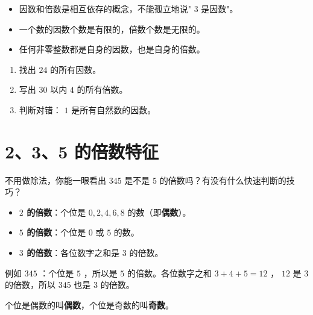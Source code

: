 \begin{keytakeaway}


\begin{itemize}
  \item 因数和倍数是相互依存的概念，不能孤立地说" $3$ 是因数"。
  \item 一个数的因数个数是有限的，倍数个数是无限的。
  \item 任何非零整数都是自身的因数，也是自身的倍数。
\end{itemize}


\end{keytakeaway}

\begin{practice}


\begin{enumerate}
  \item 找出 $24$ 的所有因数。
  \item 写出 $30$ 以内 $4$ 的所有倍数。
  \item 判断对错： $1$ 是所有自然数的因数。
\end{enumerate}


\end{practice}

\section*{2、3、5 的倍数特征}


\begin{explore}


不用做除法，你能一眼看出 $345$ 是不是 $5$ 的倍数吗？有没有什么快速判断的技巧？

\end{explore}

\begin{understand}


\begin{itemize}
  \item \textbf{ $2$ 的倍数}：个位是 $0, 2, 4, 6, 8$ 的数（即\textbf{偶数}）。
  \item \textbf{ $5$ 的倍数}：个位是 $0$ 或 $5$ 的数。
  \item \textbf{ $3$ 的倍数}：各位数字之和是 $3$ 的倍数。
\end{itemize}


例如 $345$ ：个位是 $5$ ，所以是 $5$ 的倍数。各位数字之和 $3 + 4 + 5 = 12$ ， $12$ 是 $3$ 的倍数，所以 $345$ 也是 $3$ 的倍数。

个位是偶数的叫\textbf{偶数}，个位是奇数的叫\textbf{奇数}。

\end{understand}

